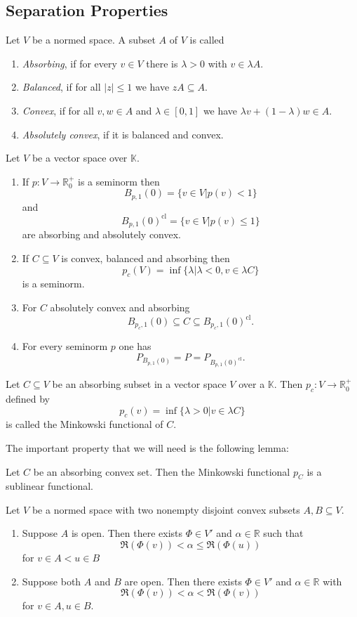 \documentclass[prb,12pt]{revtex4-2}
\theoremstyle{definition}
\theoremstyle{definition}
\theoremstyle{definition}
\newenvironment{parts}{\begin{enumerate}[label=(\alph*)]}{\end{enumerate}}
\newcommand{\R}{\mathbb{R}}
\begin{document}
\subsection{Separation Properties}
\begin{Definition}
	Let $V$ be a normed space. A subset $A$ of $V$ is called
	\begin{parts}
	\item \emph{Absorbing}, if for every $v\in V$ there is $\lambda>0$ with $v\in \lambda A$.
	\item \emph{Balanced}, if for all $|z|\le 1$ we have $zA\subseteq A$.
	\item \emph{Convex}, if for all $v,w\in A$ and $\lambda\in [0,1]$ we have $\lambda v+(1-\lambda)w\in A$.
	\item \emph{Absolutely convex}, if it is balanced and convex.
	\end{parts}
\end{Definition}
\begin{Theorem}
	Let $V$ be a vector space over $\mathbb{K}$.
	\begin{parts}
	\item If $p:V \to \R_0^+$ is a seminorm then
		\[
			B_{p,1}(0)=\{v\in V|p(v)<1\} 
		\]
		and
		\[
			B_{p,1}(0)^\text{cl}=\{v\in V|p(v)\le 1\} 
		\]
		are absorbing and absolutely convex.
	\item If $C\subseteq V$ is convex, balanced and absorbing then
		\[
		p_c(V)=\inf \{\lambda| \lambda<0,v\in \lambda C\} 
	\]
	is a seminorm.
\item For $C$ absolutely convex and absorbing
	\[
		B_{p_c, 1}(0)\subseteq C \subseteq B_{p_c, 1}(0)^\text{cl}
	.\] 
\item For every seminorm $p$ one has
	\[
		P_{B_{p, 1}(0)}=P=P_{B_{p,1}(0)^\text{cl}}
	.\] 
	\end{parts}
\end{Theorem}
\begin{Definition}
	Let $C\subseteq V$ be an absorbing subset in a vector space $V$ over a $\mathbb{K}$. Then $p_c:V\to \R_0^+$ defined by
	\[
	p_c(v)=\inf \{\lambda>0|v\in \lambda C\} 
\]
is called the Minkowski functional of $C$.
\end{Definition}
The important property that we will need is the following lemma:
\begin{Lemma}
	Let $C$ be an absorbing convex set. Then the Minkowski functional $p_C$ is a sublinear functional.
\end{Lemma}
\begin{Theorem}[Separation I]\label{thm:sep1}
	Let $V$ be a normed space with two nonempty disjoint convex subsets $A,B\subseteq V$.
	\begin{parts}
	\item Suppose $A$ is open. Then there exists $\Phi\in V'$ and $\alpha\in \R$ such that
		\[
		\Re(\Phi(v))<\alpha\le \Re(\Phi(u))
	\]
	for $v\in A< u\in B$
\item Suppose both $A$ and $B$ are open. Then there exists $\Phi\in V'$ and $\alpha\in \R$ with
	\[
	\Re(\Phi(v))<\alpha<\Re(\Phi(v))
\]
for $v\in A, u\in B$.
	\end{parts}
\end{Theorem}
\end{document}
